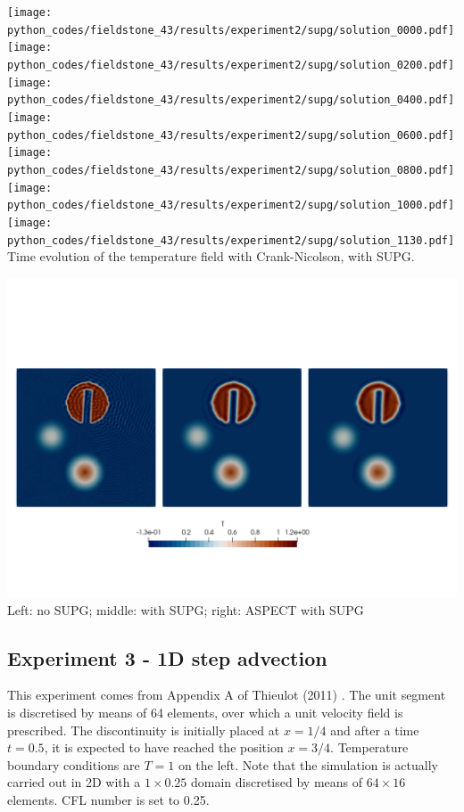 \begin{center}
\texttt{[image: python\_codes/fieldstone\_43/results/experiment2/supg/solution\_0000.pdf]}
\texttt{[image: python\_codes/fieldstone\_43/results/experiment2/supg/solution\_0200.pdf]}
\texttt{[image: python\_codes/fieldstone\_43/results/experiment2/supg/solution\_0400.pdf]}
\texttt{[image: python\_codes/fieldstone\_43/results/experiment2/supg/solution\_0600.pdf]}\\
\texttt{[image: python\_codes/fieldstone\_43/results/experiment2/supg/solution\_0800.pdf]}
\texttt{[image: python\_codes/fieldstone\_43/results/experiment2/supg/solution\_1000.pdf]}
\texttt{[image: python\_codes/fieldstone\_43/results/experiment2/supg/solution\_1130.pdf]}\\
{\captionfont Time evolution of the temperature field with Crank-Nicolson, with SUPG.}
\end{center}


\begin{center}
\includegraphics[width=15cm]{python_codes/fieldstone_43/results/experiment2/Temps}\\
{\captionfont Left: no SUPG; middle: with SUPG; right: ASPECT with SUPG}
\end{center}


\newpage
\subsection*{Experiment 3 - 1D step advection}

This experiment comes from Appendix A of Thieulot (2011) \cite{thie11}.
The unit segment is discretised by means of 64 elements, 
over which a unit velocity field is prescribed.
The discontinuity is initially
placed at $x=1/4$ and after a time $t=0.5$, it is expected to have
reached the position $x=3/4$.
Temperature boundary conditions are $T=1$ on the left. 
Note that the simulation is actually carried out in 2D with a $1\times0.25$ domain 
discretised by means of $64\times16$ elements.
CFL number is set to 0.25.

